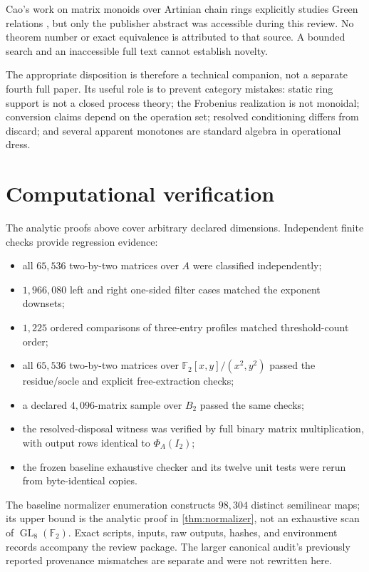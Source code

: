 \documentclass[11pt]{article}
\theoremstyle{definition}
\theoremstyle{remark}
\newcommand{\F}{\mathbb F_2}
\newcommand{\GL}{\operatorname{GL}}
\begin{document}
Cao's work on matrix monoids over Artinian chain rings explicitly studies Green relations \cite{Cao}, but only the publisher abstract was accessible during this review. No theorem number or exact equivalence is attributed to that source. A bounded search and an inaccessible full text cannot establish novelty.

The appropriate disposition is therefore a technical companion, not a separate fourth full paper. Its useful role is to prevent category mistakes: static ring support is not a closed process theory; the Frobenius realization is not monoidal; conversion claims depend on the operation set; resolved conditioning differs from discard; and several apparent monotones are standard algebra in operational dress.

\section{Computational verification}

The analytic proofs above cover arbitrary declared dimensions. Independent finite checks provide regression evidence:

\begin{itemize}
  \item all $65{,}536$ two-by-two matrices over $A$ were classified independently;
  \item $1{,}966{,}080$ left and right one-sided filter cases matched the exponent downsets;
  \item $1{,}225$ ordered comparisons of three-entry profiles matched threshold-count order;
  \item all $65{,}536$ two-by-two matrices over $\F[x,y]/(x^2,y^2)$ passed the residue/socle and explicit free-extraction checks;
  \item a declared $4{,}096$-matrix sample over $B_2$ passed the same checks;
  \item the resolved-disposal witness was verified by full binary matrix multiplication, with output rows identical to $\Phi_A(I_2)$;
  \item the frozen baseline exhaustive checker and its twelve unit tests were rerun from byte-identical copies.
\end{itemize}

The baseline normalizer enumeration constructs $98{,}304$ distinct semilinear maps; its upper bound is the analytic proof in \cref{thm:normalizer}, not an exhaustive scan of $\GL_8(\F)$. Exact scripts, inputs, raw outputs, hashes, and environment records accompany the review package. The larger canonical audit's previously reported provenance mismatches are separate and were not rewritten here.
\end{document}
